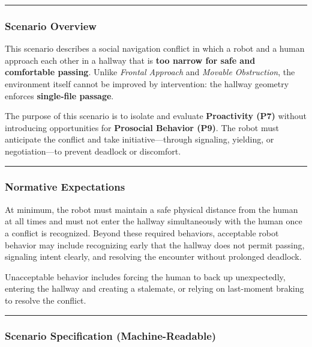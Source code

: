 \documentclass[utf8]{frontiers_suppmat} %
\begin{document}
\begin{center}\rule{0.5\linewidth}{0.5pt}\end{center}

\subsubsection{Scenario Overview}\label{scenario-overview}

This scenario describes a social navigation conflict in which a robot
and a human approach each other in a hallway that is \textbf{too narrow
for safe and comfortable passing}. Unlike \emph{Frontal Approach} and
\emph{Movable Obstruction}, the environment itself cannot be improved by
intervention: the hallway geometry enforces \textbf{single‑file
passage}.

The purpose of this scenario is to isolate and evaluate
\textbf{Proactivity (P7)} without introducing opportunities for
\textbf{Prosocial Behavior (P9)}. The robot must anticipate the conflict
and take initiative---through signaling, yielding, or negotiation---to
prevent deadlock or discomfort.

\begin{center}\rule{0.5\linewidth}{0.5pt}\end{center}

\subsubsection{Normative Expectations}\label{normative-expectations}

At minimum, the robot must maintain a safe physical distance from the
human at all times and must not enter the hallway simultaneously with
the human once a conflict is recognized. Beyond these required
behaviors, acceptable robot behavior may include recognizing early that
the hallway does not permit passing, signaling intent clearly, and
resolving the encounter without prolonged deadlock.

Unacceptable behavior includes forcing the human to back up
unexpectedly, entering the hallway and creating a stalemate, or relying
on last-moment braking to resolve the conflict.

\begin{center}\rule{0.5\linewidth}{0.5pt}\end{center}

\subsubsection{Scenario Specification
(Machine-Readable)}\label{scenario-specification-machine-readable}
\end{document}
